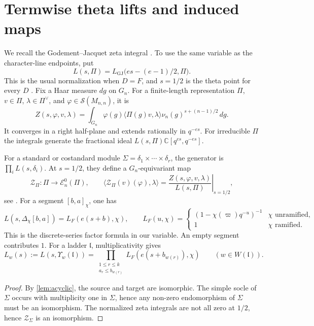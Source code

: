 \documentclass[10pt,a4paper]{article}
\newtheorem{lemma}[theorem]{Lemma}
\theoremstyle{definition}
\theoremstyle{remark}
\numberwithin{equation}{section}
\newcommand{\CC}{\mathbb{C}}
\newcommand{\fl}{\mathfrak{l}}
\newcommand{\cS}{\mathcal{S}}
\newcommand{\cZ}{\mathcal{Z}}
\newcommand{\cE}{\mathcal{E}}
\newcommand{\De}{\Delta}
\begin{document}
\section{Termwise theta lifts and induced maps}

We recall the Godement--Jacquet zeta integral \cite[\S\S3--5]{GJ1972}.
To use the same variable as the character-line endpoints, put
\[
 L(s,\Pi)=L_{\mathrm{GJ}}\bigl(es-(e-1)/2,\Pi\bigr).
\]
This is the usual normalization when $D=F$, and $s=1/2$ is the
theta point for every $D$ \cite[Theorem~2.1]{FSX2018}.
Fix a Haar measure $dg$ on $G_n$. For a finite-length representation $\Pi$,
$v\in\Pi$, $\lambda\in\Pi^\vee$, and $\varphi\in\cS(M_{n,n})$, it is
\begin{equation}\label{eq:zeta}
 Z(s,\varphi,v,\lambda)
 =\int_{G_n}\varphi(g)\langle\Pi(g)v,\lambda\rangle
                   \nu_n(g)^{s+(n-1)/2}\,dg.
\end{equation}
It converges in a right half-plane and extends rationally in $q^{-es}$.
For irreducible $\Pi$ the integrals generate the fractional ideal
$L(s,\Pi)\CC[q^{es},q^{-es}]$.

For a standard or costandard module
$\Sigma=\delta_1\times\cdots\times\delta_r$, the generator is
$\prod_iL(s,\delta_i)$.
At $s=1/2$, they define a $G_n$-equivariant map
\begin{equation}\label{eq:zeta-map}
 \cZ_\Pi:\Pi\longrightarrow\cE^0_n(\Pi),\qquad
 \big\langle\cZ_\Pi(v)(\varphi),\lambda\big\rangle
 =\left.\frac{Z(s,\varphi,v,\lambda)}{L(s,\Pi)}\right|_{s=1/2},
\end{equation}
see \cite{FSX2018}. For a segment $[b,a]_\chi$, one has
\[
 L(s,\De_\chi[b,a])=L_F(e(s+b),\chi),\qquad
 L_F(u,\chi)=
 \begin{cases}
 (1-\chi(\varpi)q^{-u})^{-1}&\chi\text{ unramified},\\
 1&\chi\text{ ramified}.
 \end{cases}
\]
This is the discrete-series factor formula
\cite[Theorem~2.2(b),(f),(h) and equation~(8) in its proof]{ABPSDepth2016}
in our variable.
An empty segment contributes $1$. For a ladder $\fl$, multiplicativity
gives
\begin{equation}\label{eq:term-L}
 L_w(s):=L(s,\Upsilon_w(\fl))
 =\prod_{\substack{1\leq r\leq k\\a_r\leq b_{w(r)}}}
   L_F(e(s+b_{w(r)}),\chi)\qquad(w\in W(\fl)).
\end{equation}
\begin{proof}
By \cref{lem:acyclic}, the source and target are isomorphic.
The simple socle of $\Sigma$ occurs with multiplicity one in $\Sigma$, hence any non-zero endomorphism of $\Sigma$ must be an isomorphism.
The normalized zeta integrals are not all zero at $1/2$, hence
$\cZ_{\Sigma}$ is an isomorphism.
\end{proof}
\end{document}
